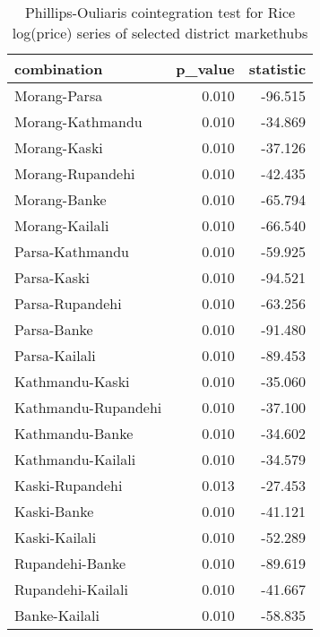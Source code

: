 \documentclass[12pt,]{article}
\begin{document}
\begin{longtable}[t]{lrr}
\caption{\label{tab:pairwise-phillips-cointegration}Phillips-Ouliaris cointegration test for Rice log(price) series of selected district markethubs}\\
\toprule
combination & p\_value & statistic\\
\midrule
Morang-Parsa & 0.010 & -96.515\\
Morang-Kathmandu & 0.010 & -34.869\\
Morang-Kaski & 0.010 & -37.126\\
Morang-Rupandehi & 0.010 & -42.435\\
Morang-Banke & 0.010 & -65.794\\
\addlinespace
Morang-Kailali & 0.010 & -66.540\\
Parsa-Kathmandu & 0.010 & -59.925\\
Parsa-Kaski & 0.010 & -94.521\\
Parsa-Rupandehi & 0.010 & -63.256\\
Parsa-Banke & 0.010 & -91.480\\
\addlinespace
Parsa-Kailali & 0.010 & -89.453\\
Kathmandu-Kaski & 0.010 & -35.060\\
Kathmandu-Rupandehi & 0.010 & -37.100\\
Kathmandu-Banke & 0.010 & -34.602\\
Kathmandu-Kailali & 0.010 & -34.579\\
\addlinespace
Kaski-Rupandehi & 0.013 & -27.453\\
Kaski-Banke & 0.010 & -41.121\\
Kaski-Kailali & 0.010 & -52.289\\
Rupandehi-Banke & 0.010 & -89.619\\
Rupandehi-Kailali & 0.010 & -41.667\\
\addlinespace
Banke-Kailali & 0.010 & -58.835\\
\bottomrule
\end{longtable}
\end{document}
